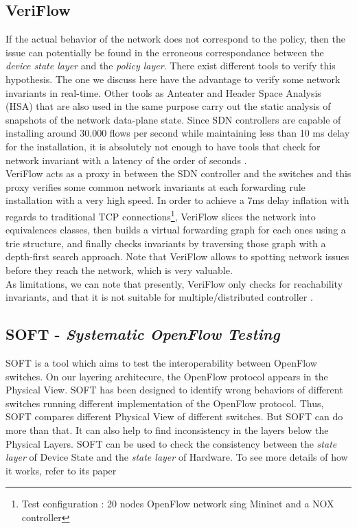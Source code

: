 \documentclass[10pt,article]{IEEEtran}
\begin{document}
\subsection{VeriFlow}
If the actual behavior of the network does not correspond to the policy, then the issue can potentially be found in the erroneous correspondance between the \textit{device state layer} and the \textit{policy layer}. There exist different tools to verify this hypothesis. The one we discuss here have the advantage to verify some network invariants in real-time. Other tools as Anteater and Header Space Analysis (HSA) that are also used in the same purpose carry out the static analysis of snapshots of the network data-plane state\cite{Kazemian:2012:HSA:2228298.2228311}\cite{Mai:2011:DDP:2018436.2018470}. Since SDN controllers are capable of installing around 30.000 flows per second while maintaining less than 10 ms delay for the installation, it is absolutely not enough to have tools that check for network invariant with a latency of the order of seconds \cite{Khurshid:2013:VVN:2482626.2482630}.\\
VeriFlow acts as a proxy in between the SDN controller and the switches and this proxy verifies some common network invariants at each forwarding rule installation with a very high speed. In order to achieve a 7ms delay inflation with regards to traditional TCP connections\footnote{Test configuration : 20 nodes OpenFlow network sing Mininet and a NOX controller\cite{Khurshid:2013:VVN:2482626.2482630} }, VeriFlow slices the network into equivalences classes, then builds a virtual forwarding graph for each ones using a trie structure, and finally checks invariants by traversing those graph with a depth-first search approach. Note that VeriFlow allows to spotting network issues before they reach the network, which is very valuable.\\
As limitations, we can note that presently, VeriFlow only checks for reachability invariants, and that it is not suitable for multiple/distributed controller \cite{Khurshid:2013:VVN:2482626.2482630}.

\subsection{SOFT - \textit{Systematic OpenFlow Testing}}
SOFT is a tool which aims to test the interoperability between OpenFlow switches. On our layering architecure, the OpenFlow protocol appears in the Physical View. SOFT has been designed to identify wrong behaviors of different switches running different implementation of the OpenFlow protocol. Thus, SOFT compares different Physical View of different switches. But SOFT can do more than that. It can also help to find inconsistency in the layers below the Physical Layers. SOFT can be used to check the consistency between the \textit{state layer} of Device State and the \textit{state layer} of Hardware. To see more details of how it works, refer to its paper \cite{SOFT}
\end{document}
